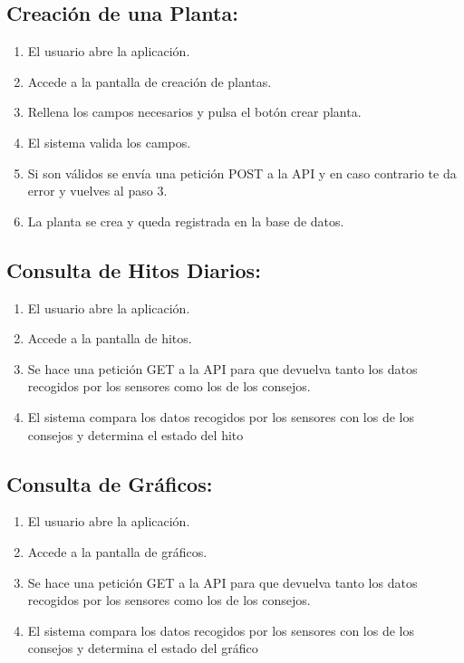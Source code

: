 \subsection{Creación de una Planta:}
    \begin{enumerate}
        \item {El usuario abre la aplicación.}
        \item {Accede a la pantalla de creación de plantas.}
        \item {Rellena los campos necesarios y pulsa el botón crear planta.}
        \item {El sistema valida los campos.}
        \item {Si son válidos se envía una petición POST a la API y en caso contrario te da error y vuelves al paso 3.}
        \item {La planta se crea y queda registrada en la base de datos.}
    \end{enumerate}

\subsection{Consulta de Hitos Diarios:}
    \begin{enumerate}
        \item {El usuario abre la aplicación.}
        \item {Accede a la pantalla de hitos.}
        \item {Se hace una petición GET a la API para que devuelva tanto los datos recogidos por los sensores como los de los consejos.}
        \item {El sistema compara los datos recogidos por los sensores con los de los consejos y determina el estado del hito}
    \end{enumerate}
    
\subsection{Consulta de Gráficos:}
    \begin{enumerate}
        \item {El usuario abre la aplicación.}
        \item {Accede a la pantalla de gráficos.}
        \item {Se hace una petición GET a la API para que devuelva tanto los datos recogidos por los sensores como los de los consejos.}
        \item {El sistema compara los datos recogidos por los sensores con los de los consejos y determina el estado del gráfico}
    \end{enumerate}
    
